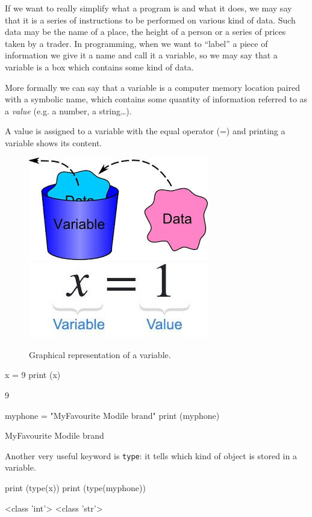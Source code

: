 If we want to really simplify what a program is and what it does, we may say that it is a series of instructions to be performed on various kind of data. Such data may be the name of a place, the height of a person or a series of prices taken by a trader. In programming, when we want to “label” a piece of information we give it a name and call it a variable, so we may say that a variable is a box which contains some kind of data.

More formally we can say that a variable is a computer memory location paired with a symbolic name, which contains some quantity of information referred to as a \emph{value} (e.g. a number, a string\ldots). 

A value is assigned to a variable with the equal operator (=) and printing a variable shows its content. 

\begin{figure}[htbp]
\centering
\includegraphics[width=0.35\linewidth]{figures/var1.jpeg}\\
\includegraphics[width=0.35\linewidth]{figures/var2.jpeg}
\caption{Graphical representation of a variable.}
\end{figure}

\begin{ipythonnon}
x = 9 
print (x)
\end{ipythonnon}
\begin{ioutput}
9
\end{ioutput}
\begin{ipythonnon}
myphone = "MyFavourite Modile brand" 
print (myphone)
\end{ipythonnon}
\begin{ioutput}
MyFavourite Modile brand
\end{ioutput}

Another very useful keyword is \texttt{type}: it tells which kind of object is stored in a variable.

\begin{ipythonnon}
print (type(x))
print (type(myphone))
\end{ipythonnon}
\begin{ioutput}
<class 'int'>
<class 'str'>
\end{ioutput}

